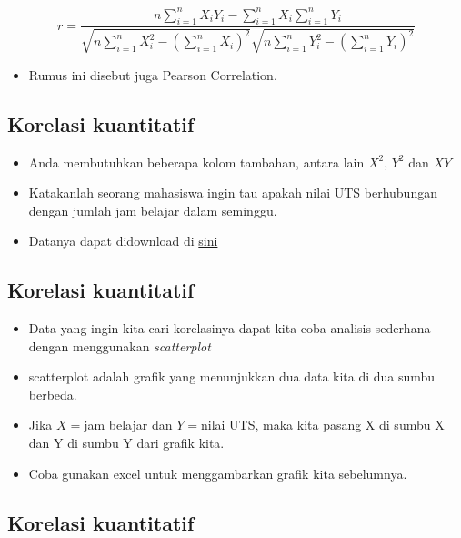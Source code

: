 \documentclass[
  letterpaper,
  DIV=11,
  numbers=noendperiod]{scrartcl}
\providecommand{\tightlist}{%
  \setlength{\itemsep}{0pt}\setlength{\parskip}{0pt}}\usepackage{longtable,booktabs,array}
\begin{document}
\[
r=\frac{n\sum_{i=1}^{n}X_iY_i-\sum_{i=1}^{n}X_i\sum_{i=1}^{n}Y_i}{\sqrt{n\sum_{i=1}^{n}X_i^2-\left(\sum_{i=1}^{n}X_i\right)^2} \sqrt{n\sum_{i=1}^{n}Y_i^2-\left(\sum_{i=1}^{n}Y_i\right)^2}}
\]

\begin{itemize}
\tightlist
\item
  Rumus ini disebut juga Pearson Correlation.
\end{itemize}

\subsection{Korelasi kuantitatif}\label{korelasi-kuantitatif-1}

\begin{itemize}
\item
  Anda membutuhkan beberapa kolom tambahan, antara lain \(X^2\), \(Y^2\)
  dan \(XY\)
\item
  Katakanlah seorang mahasiswa ingin tau apakah nilai UTS berhubungan
  dengan jumlah jam belajar dalam seminggu.
\item
  Datanya dapat didownload di
  \href{https://docs.google.com/spreadsheets/d/16ZuQPD1sk76pv6sRpvjiiZcSP68CNPRq/edit?usp=drive_link&ouid=117760147588370390523&rtpof=true&sd=true}{sini}
\end{itemize}

\subsection{Korelasi kuantitatif}\label{korelasi-kuantitatif-2}

\begin{itemize}
\item
  Data yang ingin kita cari korelasinya dapat kita coba analisis
  sederhana dengan menggunakan \emph{scatterplot}
\item
  scatterplot adalah grafik yang menunjukkan dua data kita di dua sumbu
  berbeda.
\item
  Jika \(X=\)jam belajar dan \(Y=\)nilai UTS, maka kita pasang X di
  sumbu X dan Y di sumbu Y dari grafik kita.
\item
  Coba gunakan excel untuk menggambarkan grafik kita sebelumnya.
\end{itemize}

\subsection{Korelasi kuantitatif}\label{korelasi-kuantitatif-3}
\end{document}
